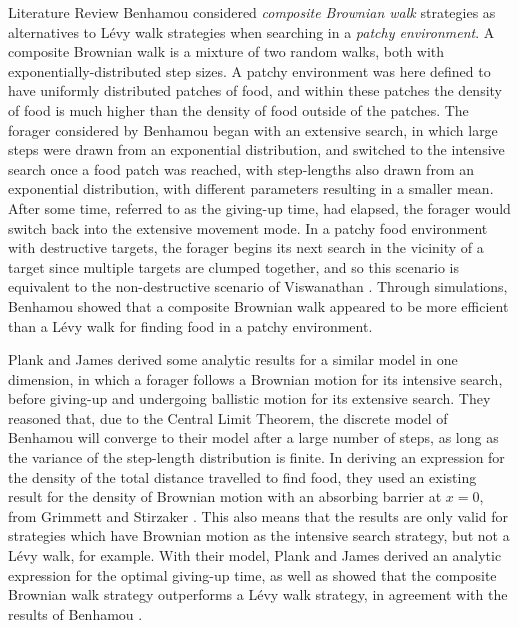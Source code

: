 \begin{section}{Literature Review \label{sec:litreview}}
Benhamou \cite{Benhamou_2007} considered \emph{composite Brownian walk} strategies as alternatives to L\'{e}vy walk strategies when searching in a \emph{patchy environment}. 
A composite Brownian walk is a mixture of two random walks, both with exponentially-distributed step sizes. 
A patchy environment was here defined to have uniformly distributed patches of food, and within these patches the density of food is much higher than the density of food outside of the patches.
The forager considered by Benhamou began with an extensive search, in which large steps were drawn from an exponential distribution, and switched to the intensive search once a food patch was reached, with step-lengths also drawn from an exponential distribution, with different parameters resulting in a smaller mean.
After some time, referred to as the giving-up time, had elapsed, the forager would switch back into the extensive movement mode.
In a patchy food environment with destructive targets, the forager begins its next search in the vicinity of a target since multiple targets are clumped together, and so this scenario is equivalent to the non-destructive scenario of Viswanathan \etal \cite{Viswanathan_1999}.
Through simulations, Benhamou \cite{Benhamou_2007} showed that a composite Brownian walk appeared to be more efficient than a L\'{e}vy walk for finding food in a patchy environment.

Plank and James \cite{Plank_2008} derived some analytic results for a similar model in one dimension, in which a forager follows a Brownian motion for its intensive search, before giving-up and undergoing ballistic motion for its extensive search.
They reasoned that, due to the Central Limit Theorem, the discrete model of Benhamou \cite{Benhamou_2007} will converge to their model after a large number of steps, as long as the variance of the step-length distribution is finite.
In deriving an expression for the density of the total distance travelled to find food, they used an existing result for the density of Brownian motion with an absorbing barrier at $x=0$, from Grimmett and Stirzaker \cite{Grimmett_2001}. 
This also means that the results are only valid for strategies which have Brownian motion as the intensive search strategy, but not a L\'{e}vy walk, for example.
With their model, Plank and James \cite{Plank_2008} derived an analytic expression for the optimal giving-up time, as well as showed that the composite Brownian walk strategy outperforms a L\'{e}vy walk strategy, in agreement with the results of Benhamou \cite{Benhamou_2007}.


\end{section}
